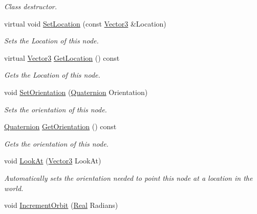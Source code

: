 \begin{DoxyCompactItemize}
\begin{DoxyCompactList}\small\item\em Class destructor. \item\end{DoxyCompactList}\item 
virtual void \hyperlink{classphys_1_1WorldNode_af276da0d87f4ddc1405bc87b9e2e034d}{SetLocation} (const \hyperlink{classphys_1_1Vector3}{Vector3} \&Location)
\begin{DoxyCompactList}\small\item\em Sets the Location of this node. \item\end{DoxyCompactList}\item 
virtual \hyperlink{classphys_1_1Vector3}{Vector3} \hyperlink{classphys_1_1WorldNode_a1e45730a3e7ad6bc30dc98982fe64624}{GetLocation} () const 
\begin{DoxyCompactList}\small\item\em Gets the Location of this node. \item\end{DoxyCompactList}\item 
void \hyperlink{classphys_1_1WorldNode_a583cbdca344ac23894ef469c7b7f6062}{SetOrientation} (\hyperlink{classphys_1_1Quaternion}{Quaternion} Orientation)
\begin{DoxyCompactList}\small\item\em Sets the orientation of this node. \item\end{DoxyCompactList}\item 
\hyperlink{classphys_1_1Quaternion}{Quaternion} \hyperlink{classphys_1_1WorldNode_a90b439d8af095c040b2d9e4576a113d1}{GetOrientation} () const 
\begin{DoxyCompactList}\small\item\em Gets the orientation of this node. \item\end{DoxyCompactList}\item 
void \hyperlink{classphys_1_1WorldNode_aa0373976b11af2171188d2ee8c114420}{LookAt} (\hyperlink{classphys_1_1Vector3}{Vector3} LookAt)
\begin{DoxyCompactList}\small\item\em Automatically sets the orientation needed to point this node at a location in the world. \item\end{DoxyCompactList}\item 
void \hyperlink{classphys_1_1WorldNode_a0849395a47c9cd3182a6a3717b95bcbc}{IncrementOrbit} (\hyperlink{namespacephys_af7eb897198d265b8e868f45240230d5f}{Real} Radians)

\end{DoxyCompactItemize}
